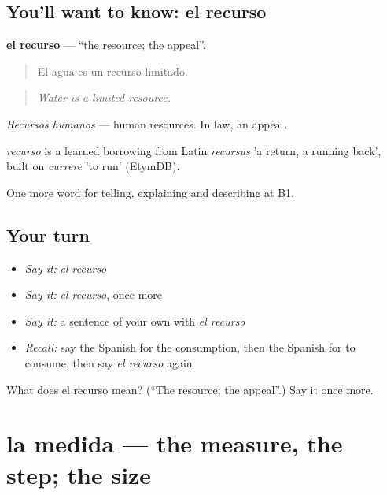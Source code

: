 \subsection*{You'll want to know: el recurso}
\textbf{el recurso} — \textquotedblleft{}the resource; the appeal\textquotedblright{}.

\begin{quote}
El agua es un recurso limitado.
\end{quote}

\begin{quote}
\emph{Water is a limited resource.}
\end{quote}

\emph{Recursos humanos} — human resources. In law, an appeal.

\begin{cousinweb}
\emph{recurso} is a learned borrowing from Latin \emph{recursus} 'a return, a running back', built on \emph{currere} 'to run' (EtymDB).
\end{cousinweb}

\begin{grammarlens}[title={What you've built}]
One more word for telling, explaining and describing at B1.
\end{grammarlens}

\subsection*{Your turn}
\begin{itemize}
\raggedright
  \item \emph{Say it:} \emph{el recurso}
  \item \emph{Say it:} \emph{el recurso}, once more
  \item \emph{Say it:} a sentence of your own with \emph{el recurso}
  \item \emph{Recall:} say the Spanish for the consumption, then the Spanish for to consume, then say \emph{el recurso} again
\end{itemize}

\begin{tcolorbox}[breakable,colback=teal!4,colframe=teal!35!black,title={Before you move on}]
What does el recurso mean? (\textquotedblleft{}The resource; the appeal\textquotedblright{}.) Say it once more.
\end{tcolorbox}
\section[la medida]{la medida — the measure, the step; the size}

